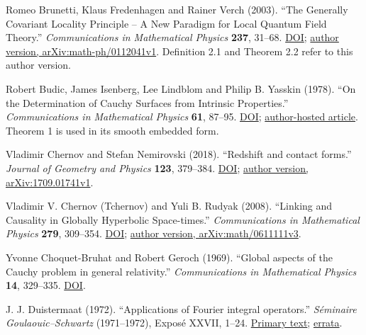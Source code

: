 \documentclass[
  english,
  11pt,
  reqno]{amsart}
\begin{document}
\begin{thebibliography}{}
\leavevmode{}\label{ref-BrunettiFredenhagenVerch2003}%
Romeo Brunetti, Klaus Fredenhagen and Rainer Verch (2003). ``The
Generally Covariant Locality Principle -- A New Paradigm for Local
Quantum Field Theory.'' \emph{Communications in Mathematical Physics}
\textbf{237}, 31--68.
\href{https://doi.org/10.1007/s00220-003-0815-7}{DOI};
\href{https://arxiv.org/abs/math-ph/0112041v1}{author version,
arXiv:math-ph/0112041v1}. Definition 2.1 and Theorem 2.2 refer to this
author version.

\leavevmode{}\label{ref-BudicIsenbergLindblomYasskin1978}%
Robert Budic, James Isenberg, Lee Lindblom and Philip B. Yasskin (1978).
``On the Determination of Cauchy Surfaces from Intrinsic Properties.''
\emph{Communications in Mathematical Physics} \textbf{61}, 87--95.
\href{https://doi.org/10.1007/BF01609469}{DOI};
\href{https://ccom.ucsd.edu/~lindblom/Publications/10_CommMathPhys.61.87.pdf}{author-hosted
article}. Theorem 1 is used in its smooth embedded form.

\leavevmode{}\label{ref-ChernovNemirovski2018}%
Vladimir Chernov and Stefan Nemirovski (2018). ``Redshift and contact
forms.'' \emph{Journal of Geometry and Physics} \textbf{123}, 379--384.
\href{https://doi.org/10.1016/j.geomphys.2017.09.017}{DOI};
\href{https://arxiv.org/abs/1709.01741v1}{author version,
arXiv:1709.01741v1}.

\leavevmode{}\label{ref-ChernovRudyak2008}%
Vladimir V. Chernov (Tchernov) and Yuli B. Rudyak (2008). ``Linking and
Causality in Globally Hyperbolic Space-times.'' \emph{Communications in
Mathematical Physics} \textbf{279}, 309--354.
\href{https://doi.org/10.1007/s00220-008-0414-8}{DOI};
\href{https://arxiv.org/abs/math/0611111v3}{author version,
arXiv:math/0611111v3}.

\leavevmode{}\label{ref-ChoquetBruhatGeroch1969}%
Yvonne Choquet-Bruhat and Robert Geroch (1969). ``Global aspects of the
Cauchy problem in general relativity.'' \emph{Communications in
Mathematical Physics} \textbf{14}, 329--335.
\href{https://doi.org/10.1007/BF01645389}{DOI}.

\leavevmode{}\label{ref-Duistermaat1972}%
J. J. Duistermaat (1972). ``Applications of Fourier integral
operators.'' \emph{Séminaire \mbox{Goulaouic--Schwartz}} (1971--1972), Exposé
XXVII, 1--24.
\href{https://www.numdam.org/article/SEDP_1971-1972____A27_0.pdf}{Primary
text};
\href{https://www.numdam.org/item/SEDP_1971-1972____A33_0.pdf}{errata}.


\end{thebibliography}
\end{document}
